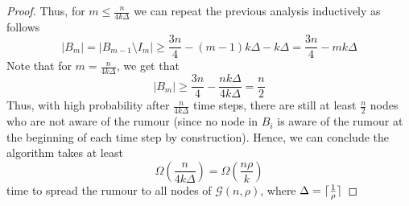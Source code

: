 \begin{proof}
	Thus, for $m \leq \frac{n}{4k\Delta}$ we can repeat the previous analysis inductively as follows %
	$$
		|B_m| = |B_{m-1} \setminus I_m| \geq \frac{3n}{4} - (m-1)k\Delta - k\Delta = \frac{3n}{4} - mk\Delta
	$$
	Note that for $m = \frac{n}{4k\Delta}$, we get that 
	$$
		|B_m| \geq \frac{3n}{4} - \frac{nk\Delta}{4k\Delta} = \frac{n}{2}
	$$
	Thus, with high probability after $\frac{n}{4k\Delta}$ time steps, there are still at least $\frac{n}{2}$ nodes who are not aware of the rumour (since no node in $B_i$ is aware of the rumour at the beginning of each time step by construction). Hence, we can conclude the algorithm takes at least 
	$$
		\Omega\left(\frac{n}{4k\Delta}\right) = \Omega\left(\frac{n\rho}{k}\right)
	$$
	time to spread the rumour to all nodes of $\mathcal{G}(n, \rho)$, where $\Delta = \lceil\frac{1}{\rho}\rceil$
\end{proof}